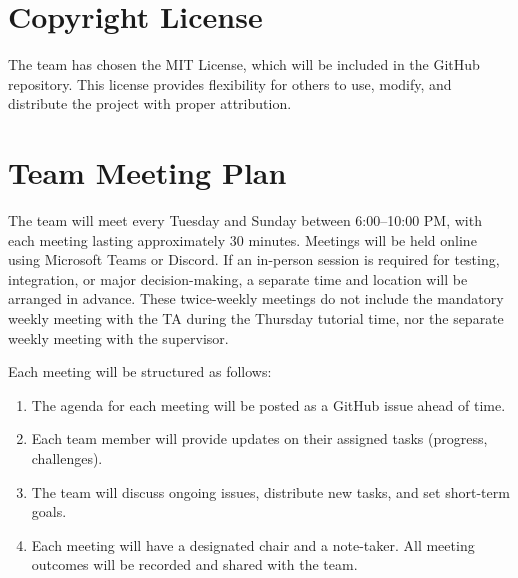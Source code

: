 \documentclass{article}
\begin{document}
\section{Copyright License}


The team has chosen the MIT License, which will be included in the GitHub 
repository. This license provides flexibility for others to use, modify, 
and distribute the project with proper attribution.


\section{Team Meeting Plan}






The team will meet every Tuesday and Sunday between 6:00--10:00 PM, with each meeting lasting approximately 30 minutes. 
Meetings will be held online using Microsoft Teams or Discord. If an in-person session is required for testing, integration, or major 
decision-making, a separate time and location will be arranged in advance. These twice-weekly meetings do not include 
the mandatory weekly meeting with the TA during the Thursday tutorial time, nor the separate weekly meeting with the supervisor.

Each meeting will be structured as follows:

\begin{enumerate}
    \item The agenda for each meeting will be posted as a GitHub issue ahead of time.
    \item Each team member will provide updates on their assigned tasks (progress, challenges).
    \item The team will discuss ongoing issues, distribute new tasks, and set short-term goals.
    \item Each meeting will have a designated chair and a note-taker. All meeting outcomes will be recorded and shared with the team.
\end{enumerate}
\end{document}
